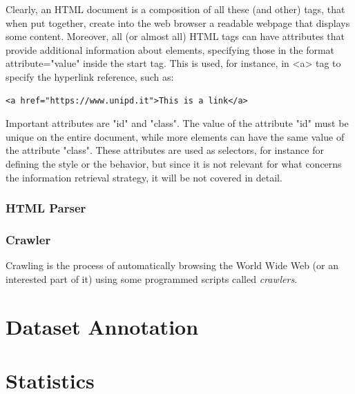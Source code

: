 Clearly, an HTML document is a composition of all these (and other) tags, that when put together, create into the web browser a readable webpage that displays some content. Moreover, all (or almost all) HTML tags can have attributes that provide additional information about elements, specifying those in the format attribute="value" inside the start tag. This is used, for instance, in <a> tag to specify the hyperlink reference, such as:
\begin{lstlisting}
<a href="https://www.unipd.it">This is a link</a>
\end{lstlisting}
Important attributes are  "id" and "class". The value of the attribute "id"  must be unique on the entire document, while more elements can have the same value of the attribute "class". These attributes are used as selectors, for instance for defining the style or the behavior, but since it is not relevant for what concerns the information retrieval strategy, it will be not covered in detail.

\subsubsection{HTML Parser}




\subsubsection{Crawler}

Crawling is the process of automatically browsing the World Wide Web (or an interested part of it) using some programmed scripts called \textit{crawlers}.








\section{Dataset Annotation}

\section{Statistics}

